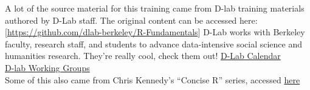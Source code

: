 \documentclass[]{article}
\begin{document}
A lot of the source material for this training came from D-lab training
materials authored by D-Lab staff. The original content can be accessed
here: {[}\url{https://github.com/dlab-berkeley/R-Fundamentals}{]} D-Lab
works with Berkeley faculty, research staff, and students to advance
data-intensive social science and humanities research. They're really
cool, check them out!
\href{http://dlab.berkeley.edu/calendar-node-field-date}{D-Lab
Calendar}\\
\href{http://dlab.berkeley.edu/working-groups}{D-lab Working Groups}\\
Some of this also came from Chris Kennedy's ``Concise R'' series,
accessed \href{https://github.com/ck37/concise-r}{here}
\end{document}
